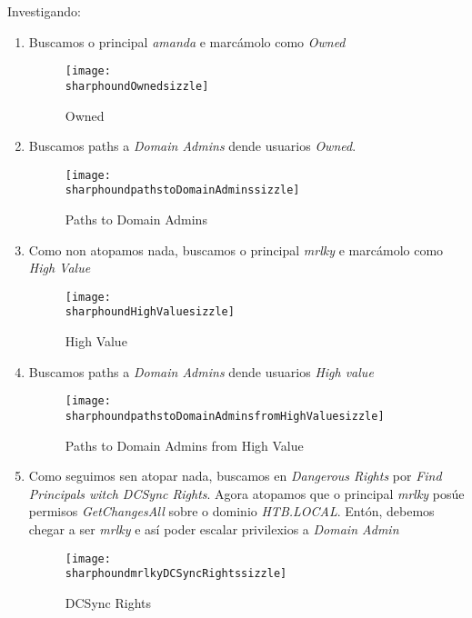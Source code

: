 \documentclass[a4paper]{article}
\newcommand{\sharphoundOwnedsizzle}{sharphound_Owned_sizzle.png}
\newcommand{\sharphoundpathstoDomainAdminssizzle}{sharphound_paths_to_Domain_Admins_sizzle.png}
\newcommand{\sharphoundHighValuesizzle}{sharphound_High_Value_sizzle.png}
\newcommand{\sharphoundpathstoDomainAdminsfromHighValuesizzle}{sharphound_paths_to_Domain_Admins_from_High_Value_sizzle.png}
\newcommand{\sharphoundmrlkyDCSyncRightssizzle}{sharphound_mrlky_DCSync_Rights_sizzle.png}
\begin{document}
\vspace*{-0.6cm}
Investigando:
        \begin{enumerate}[label=(\arabic*)]
                \item Buscamos o principal \textit{amanda} e marcámolo como \textit{Owned}
       \begin{figure}[h]
                \centering
                \texttt{[image: \\sharphoundOwnedsizzle]}
                \caption{Owned}
        \end{figure}

\vspace*{-0.4cm}
                \item Buscamos paths a \textit{Domain Admins} dende usuarios \textit{Owned}.
       \begin{figure}[h]
                \centering
                \texttt{[image: \\sharphoundpathstoDomainAdminssizzle]}
                \caption{Paths to Domain Admins}
        \end{figure}

\vspace*{-0.4cm}
                \item Como non atopamos nada, buscamos o principal \textit{mrlky} e marcámolo como \textit{High Value}
       \begin{figure}[h]
                \centering
                \texttt{[image: \\sharphoundHighValuesizzle]}
                \caption{High Value}
        \end{figure}

\clearpage
                \item Buscamos paths a \textit{Domain Admins} dende usuarios \textit{High value}
       \begin{figure}[h]
                \centering
                \texttt{[image: \\sharphoundpathstoDomainAdminsfromHighValuesizzle]}
                \caption{Paths to Domain Admins from High Value}
        \end{figure}

                \item Como seguimos sen atopar nada, buscamos en \textit{Dangerous Rights} por \textit{Find Principals witch DCSync Rights}. Agora atopamos que o principal \textit{mrlky} posúe permisos \textit{GetChangesAll} sobre o dominio \textit{HTB.LOCAL}. Entón, debemos chegar a ser \textit{mrlky} e así poder escalar privilexios a \textit{Domain Admin}
       \begin{figure}[h]
                \centering
                \texttt{[image: \\sharphoundmrlkyDCSyncRightssizzle]}
                \caption{DCSync Rights}
        \end{figure}



\end{enumerate}
\end{document}
